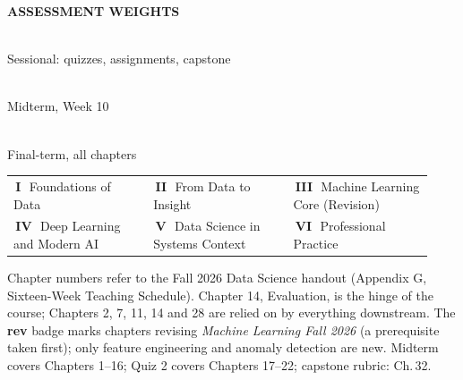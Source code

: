 \documentclass[10pt,a4paper]{article}
\makeatletter
\newcommand{\chipw}[2]{{\setlength{\fboxsep}{1.3pt}\colorbox{#1}{%
  \fontsize{6.4}{7}\selectfont\bfseries\color{white}\,#2\,}}}
\newcommand{\tile}[3]{{\colorbox{lightbg}{\parbox[c][0.9cm][c]{\dimexpr(\linewidth-3pt*\numexpr#1-1\relax)/#1-6pt-0.5pt\relax}{%
  \centering{\large\bfseries\color{primary}#2}\\[-0.5pt]{\fontsize{6.6}{7.4}\selectfont\color{sub}#3}}}}}
\newcommand{\legend}[6]{{\fontsize{6.6}{8}\selectfont\color{sub}%
  \begin{tabular}{@{}p{0.31\linewidth}p{0.31\linewidth}p{0.31\linewidth}@{}}
  \chipw{p1}{I}\ #1 & \chipw{p2}{II}\ #2 & \chipw{p3}{III}\ #3 \\[1pt]
  \chipw{p4}{IV}\ #4 & \chipw{p5}{V}\ #5 & \chipw{p6}{VI}\ #6
  \end{tabular}}}
\makeatother
\begin{document}
\vspace{3pt}
{\fontsize{6.6}{8}\selectfont\bfseries\color{neutral}\MakeUppercase{Assessment weights}}\\[2pt]
\tile{3}{20\%}{Sessional: quizzes, assignments, capstone}\hfill
\tile{3}{30\%}{Midterm, Week 10}\hfill
\tile{3}{50\%}{Final-term, all chapters}

\vspace{3pt}
\legend{Foundations of Data}{From Data to Insight}{Machine Learning Core (Revision)}
       {Deep Learning and Modern AI}{Data Science in Systems Context}{Professional Practice}

\vspace{1pt}
{\fontsize{6.3}{7.6}\selectfont\color{neutral}%
Chapter numbers refer to the Fall 2026 Data Science handout (Appendix G, Sixteen-Week Teaching Schedule). Chapter 14, Evaluation, is the hinge of the course; Chapters 2, 7, 11, 14 and 28 are relied on by everything downstream.
The {\color{accent}\bfseries rev} badge marks chapters revising \emph{Machine Learning Fall 2026} (a prerequisite taken first); only feature engineering and anomaly detection are new.
Midterm covers Chapters 1--16; Quiz 2 covers Chapters 17--22; capstone rubric: Ch.\,32.\par}
\end{document}
